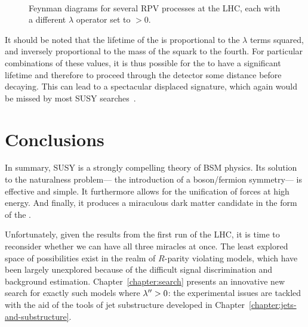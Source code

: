 

\begin{figure}
\centering
{}
\\
\caption{Feynman diagrams for several RPV processes at the LHC, each with a different $\lambda$ operator set to $>0$.}
\label{fig:susy:rpv_diagrams}
\end{figure}


It should be noted that the lifetime of the \lsp is proportional to the $\lambda$ terms squared, and inversely proportional to the mass of the squark to the fourth. For particular combinations of these values, it is thus possible for the \lsp to have a significant lifetime and therefore to proceed through the detector some distance before decaying. This can lead to a spectacular displaced signature, which again would be missed by most SUSY searches~\cite{Graham:2012th}. 


\section{Conclusions}

In summary, SUSY is a strongly compelling theory of BSM physics. Its solution to the naturalness problem--- the introduction of a boson/fermion symmetry--- is effective and simple. It furthermore allows for the unification of forces at high energy. And finally, it produces a miraculous dark matter candidate in the form of the \lsp.

Unfortunately, given the results from the first run of the LHC, it is time to reconsider whether we can have all three miracles at once. The least explored space of possibilities exist in the realm of $R$-parity violating models, which have been largely unexplored because of the difficult signal discrimination and background estimation. Chapter~\ref{chapter:search} presents an innovative new search for exactly such models where $\lambda^{\prime\prime} > 0$: the experimental issues are tackled with the aid of the tools of jet substructure developed in Chapter~\ref{chapter:jets-and-substructure}.